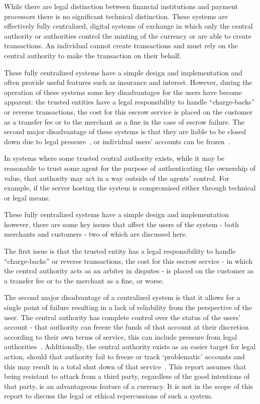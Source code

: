 While there are legal distinction between financial institutions and payment processors there is no significant technical distinction. These systems are effectively fully centralized, digital systems of exchange in which only the central authority or authorities control the minting of the currency or are able to create transactions.  An individual cannot create transactions and must rely on the central authority to make the transaction on their behalf.

These fully centralized systems have a simple design and implementation and often provide useful features such as insurance and interest.  However, during the operation of these systems some key disadvantages for the users have become apparent: the trusted entities have a legal responsibility to handle ``charge-backs'' or reverse transactions, the cost for this escrow service is placed on the customer as a transfer fee or to the merchant as a fine in the case of escrow failure. The second major disadvantage of these systems is that they are liable to be closed down due to legal pressure~\cite{lr-shutdown,lr-idictment}, or individual users' accounts can be frozen~\cite{mtgox-dwolla,vlad:mtgox-dwolla}.

In  systems where some trusted central authority exists, while it may be  reasonable to trust  some agent for the purpose of authenticating the  ownership of  value, that authority may act in a way outside of the  agents' control.  For example, if the server hosting the system is  compromised either through technical or legal means.

These fully centralized systems have a simple design and implementation however, there are some key issues that affect the users of the system - both merchants and customers - two of which are discussed here.  

The first issue is that the trusted entity has a legal responsibility to handle ``charge-backs'' or reverse transactions, the cost for this escrow service - in which the central authority acts as an arbiter in disputes - is placed on the customer as a transfer fee or to the merchant as a fine, or worse\cite{violin}.

The second major disadvantage of a centralized system is that it allows for  a single point of failure resulting in a lack of reliability from the  perspective of the user.  The central authority has complete control over the status of the users' account - that authority can freeze the funds of that account at their discretion according to their own terms of service, this can include pressure from legal authorities~\cite{mtgox-dwolla,vlad:mtgox-dwolla,wikileaks-paypal}.  Additionally, the central authority exists as an easier target for legal action, should that authority fail to freeze or track `problematic' accounts and this may result in a total shut down of that service~\cite{lr-shutdown,egold-shutdown,lr-idictment}. This report assumes that being resistant to attack from a third party, regardless of the good intentions of that party, is an advantageous feature of a currency.  It is not in the scope of this report to discuss the legal or ethical repercussions of such a system.

